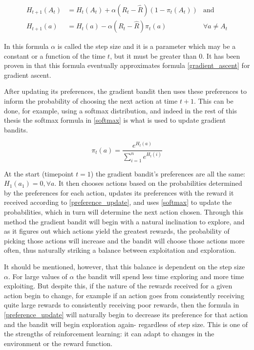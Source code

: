 \begin{align} \label{preference_update}
H_{t+1}(A_t) &= H_t(A_t) + \alpha (R_t - \hat{R}) (1 - \pi_t(A_t)) & \text{and} \\
H_{t+1}(a) &= H_t(a) - \alpha (R_t - \hat{R})\pi_t(a) & \forall a \neq A_t
\end{align}

In this formula $\alpha$ is called the step size and it is a parameter which may be a constant or a function of the time $t$, but it must be greater than 0. It has been proven in \cite{sutton_barto} that this formula eventually approximates formula \ref{gradient_ascent} for gradient ascent. 

After updating its preferences, the gradient bandit then uses these preferences to inform the probability of choosing the next action at time $t+1$. This can be done, for example, using a softmax distribution, and indeed in the rest of this thesis the softmax formula in \ref{softmax} is what is used to update gradient bandits.

\begin{equation}\label{softmax}
\pi_t(a) = \frac {e^{H_t(a)}} {\sum_{i=1}^n e^{H_t(i)}}
\end{equation}

At the start (timepoint $t = 1$) the gradient bandit’s preferences are all the same: $H_1(a_1) = 0 , \forall a$. It then chooses actions based on the probabilities determined by the preferences for each action, updates its preferences with the reward it received according to \ref{preference_update}, and uses \ref{softmax} to update the probabilities, which in turn will determine the next action chosen. Through this method the gradient bandit will begin with a natural inclination to explore, and as it figures out which actions yield the greatest rewards, the probability of picking those actions will increase and the bandit will choose those actions more often, thus naturally striking a balance between exploitation and exploration. 

It should be mentioned, however, that this balance is dependent on the step size $\alpha$. For large values of $\alpha$ the bandit will spend less time exploring and more time exploiting. But despite this, if the nature of the rewards received for a given action begin to change, for example if an action goes from consistently receiving quite large rewards to consistently receiving poor rewards, then the formula in \ref{preference_update} will naturally begin to decrease its preference for that action and the bandit will begin exploration again- regardless of step size. This is one of the strengths of reinforcement learning: it can adapt to changes in the environment or the reward function.

